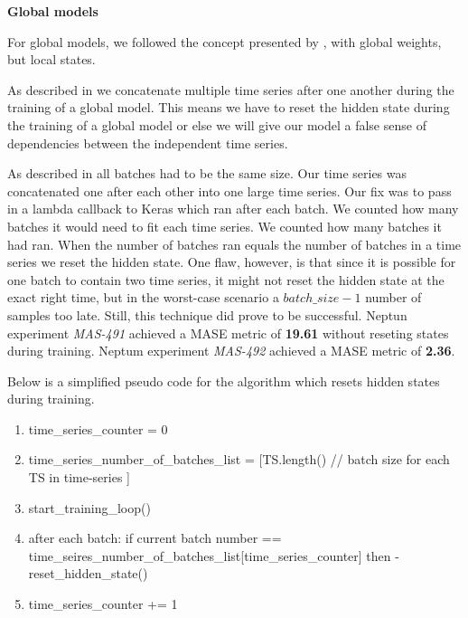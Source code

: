 \textbf{Global models}

For global models, we followed the concept presented by \cite{Smyl2020},
with global weights, but local states.

As described in 
we concatenate multiple time series after one another during the training of a global model.
This means we have to reset the hidden state during the training of a global model
or else we will give our model a false sense of dependencies between
the independent time series.

As described in  all
batches had to be the same size. Our time series was concatenated one after
each other into one large time series.
Our fix was to pass in a lambda callback to Keras which ran after each batch.
We counted how many batches it would need to fit each time series.
We counted how many batches it had ran. When the number of batches ran equals
the number of batches in a time series we reset the hidden state.
One flaw, however, is that since it is possible for one batch to
contain two time series, it might not reset the hidden state at the exact
right time, but in the worst-case scenario a $batch\_size - 1$ number of
samples too late. Still, this technique did prove to be successful.
Neptun experiment \textit{MAS-491} achieved a MASE metric of \textbf{19.61}
without reseting states during training.
Neptum experiment \textit{MAS-492} achieved a MASE metric of \textbf{2.36}.

Below is a simplified pseudo code for the algorithm which resets hidden states
during training.
\begin{enumerate}
  \item time\_series\_counter = 0
  \item time\_series\_number\_of\_batches\_list = [TS.length() // batch size for each TS in time-series ]
  \item start\_training\_loop()
  \item after each batch: if current batch number ==
        time\_seires\_number\_of\_batches\_list[time\_series\_counter]
        then -\> reset\_hidden\_state()
  \item time\_series\_counter += 1
\end{enumerate}







